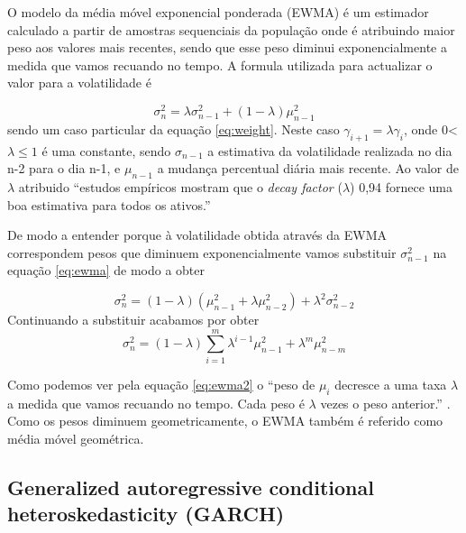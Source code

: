 \documentclass[
  12pt,
  a4paper,
  openany]{book}
\begin{document}
O modelo da média móvel exponencial ponderada (EWMA) é um estimador calculado a partir de amostras sequenciais da população onde é atribuindo maior peso aos valores mais recentes, sendo que esse peso diminui exponencialmente a medida que vamos recuando no tempo. A formula utilizada para actualizar o valor para a volatilidade é

\begin{equation} 
  \sigma_{n}^{2} = \lambda\sigma_{n-1}^{2}+(1-\lambda)\mu_{n-1}^{2} 
  \label{eq:ewma}
\end{equation}
sendo um caso particular da equação \eqref{eq:weight}. Neste caso \(\gamma_{i+1} = \lambda\gamma_{i}\), onde 0\textless{}\(\lambda\leq1\) é uma constante, sendo \(\sigma_{n-1}\) a estimativa da volatilidade realizada no dia n-2 para o dia n-1, e \(\mu_{n-1}\) a mudança percentual diária mais recente. Ao valor de \(\lambda\) atribuido ``estudos empíricos mostram que o \emph{decay factor} (\(\lambda\)) 0,94 fornece uma boa estimativa para todos os ativos.''\citep[p.4]{riskmetrics}

De modo a entender porque à volatilidade obtida através da EWMA correspondem pesos que diminuem exponencialmente vamos substituir \(\sigma_{n-1}^{2}\) na equação \eqref{eq:ewma} de modo a obter

\begin{equation} 
  \sigma_{n}^{2} = (1-\lambda)(\mu_{n-1}^{2}+\lambda\mu_{n-2}^{2})+\lambda^{2}\sigma_{n-2}^{2}
  \label{eq:ewma1}
\end{equation}
Continuando a substituir acabamos por obter
\begin{equation} 
  \sigma_{n}^{2} = (1-\lambda)\sum_{i=1}^{m}\lambda^{i-1}\mu_{n-1}^{2}+\lambda^{m}\mu_{n-m}^{2}
  \label{eq:ewma2}
\end{equation}

Como podemos ver pela equação \eqref{eq:ewma2} o ``peso de \(\mu_{i}\) decresce a uma taxa \(\lambda\) a medida que vamos recuando no tempo. Cada peso é \(\lambda\) vezes o peso anterior.'' \citep[p.226]{HullRisk2018}. Como os pesos diminuem geometricamente, o EWMA também é referido como média móvel geométrica.

\hypertarget{generalized-autoregressive-conditional-heteroskedasticity-garch}{%
\subsection{Generalized autoregressive conditional heteroskedasticity (GARCH)}\label{generalized-autoregressive-conditional-heteroskedasticity-garch}}
\end{document}
